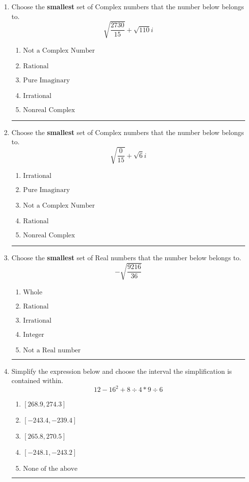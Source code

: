 \documentclass[14pt]{extbook}
\newcommand{\litem}[1]{\item#1\hspace*{-1cm}\rule{\textwidth}{0.4pt}}
\begin{document}
\begin{enumerate}
{\begin{enumerate}[label=\Alph*.]
\end{enumerate} }
\litem{
Choose the \textbf{smallest} set of Complex numbers that the number below belongs to.\[ \sqrt{\frac{2730}{15}}+\sqrt{110} i \]\begin{enumerate}[label=\Alph*.]
\item \( \text{Not a Complex Number} \)
\item \( \text{Rational} \)
\item \( \text{Pure Imaginary} \)
\item \( \text{Irrational} \)
\item \( \text{Nonreal Complex} \)

\end{enumerate} }
\litem{
Choose the \textbf{smallest} set of Complex numbers that the number below belongs to.\[ \sqrt{\frac{0}{15}}+\sqrt{6}i \]\begin{enumerate}[label=\Alph*.]
\item \( \text{Irrational} \)
\item \( \text{Pure Imaginary} \)
\item \( \text{Not a Complex Number} \)
\item \( \text{Rational} \)
\item \( \text{Nonreal Complex} \)

\end{enumerate} }
\litem{
Choose the \textbf{smallest} set of Real numbers that the number below belongs to.\[ -\sqrt{\frac{9216}{36}} \]\begin{enumerate}[label=\Alph*.]
\item \( \text{Whole} \)
\item \( \text{Rational} \)
\item \( \text{Irrational} \)
\item \( \text{Integer} \)
\item \( \text{Not a Real number} \)

\end{enumerate} }
\litem{
Simplify the expression below and choose the interval the simplification is contained within.\[ 12 - 16^2 + 8 \div 4 * 9 \div 6 \]\begin{enumerate}[label=\Alph*.]
\item \( [268.9, 274.3] \)
\item \( [-243.4, -239.4] \)
\item \( [265.8, 270.5] \)
\item \( [-248.1, -243.2] \)
\item \( \text{None of the above} \)


\end{enumerate}}
\end{enumerate}
\end{document}
